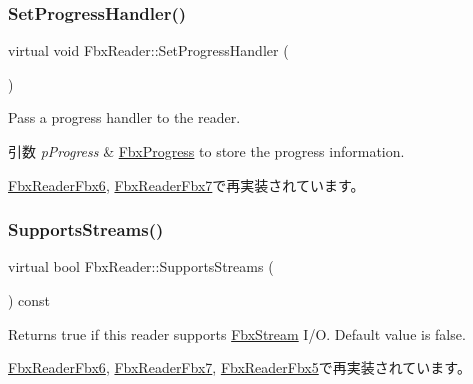 \subsubsection{\texorpdfstring{Set\+Progress\+Handler()}{SetProgressHandler()}}
{\footnotesize\ttfamily virtual void Fbx\+Reader\+::\+Set\+Progress\+Handler (\begin{DoxyParamCaption}\item[{\hyperlink{class_fbx_progress}{Fbx\+Progress} $\ast$}]{ }\end{DoxyParamCaption})\hspace{0.3cm}{\ttfamily [virtual]}}

Pass a progress handler to the reader. 
\begin{DoxyParams}{引数}
{\em p\+Progress} & \hyperlink{class_fbx_progress}{Fbx\+Progress} to store the progress information. \\
\hline
\end{DoxyParams}


\hyperlink{class_fbx_reader_fbx6_a85827a96cd550f6260854858766e4d96}{Fbx\+Reader\+Fbx6}, \hyperlink{class_fbx_reader_fbx7_a513e9084df22767dfaf95252d815abbf}{Fbx\+Reader\+Fbx7}で再実装されています。

\mbox{\label{class_fbx_reader_ab08a9e71a059ef6052e7fe2d8ba6c35d}} 
\subsubsection{\texorpdfstring{Supports\+Streams()}{SupportsStreams()}}
{\footnotesize\ttfamily virtual bool Fbx\+Reader\+::\+Supports\+Streams (\begin{DoxyParamCaption}{ }\end{DoxyParamCaption}) const\hspace{0.3cm}{\ttfamily [virtual]}}

Returns true if this reader supports \hyperlink{class_fbx_stream}{Fbx\+Stream} I/O. Default value is false. 

\hyperlink{class_fbx_reader_fbx6_ad38deb810e2c73562b9748486f4476bb}{Fbx\+Reader\+Fbx6}, \hyperlink{class_fbx_reader_fbx7_ab6283b540d9ea9141c9338400e1b8455}{Fbx\+Reader\+Fbx7}, \hyperlink{class_fbx_reader_fbx5_ae6f619a41303077d9d4ed2935f3d2108}{Fbx\+Reader\+Fbx5}で再実装されています。



